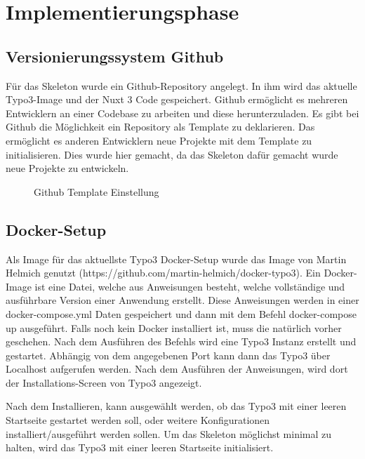 \section{Implementierungsphase} 
\label{sec:Implementierungsphase}

\subsection{Versionierungssystem Github}
\label{sec:Versionierungssystem Github}

Für das Skeleton wurde ein Github-Repository angelegt. In ihm wird das aktuelle Typo3-Image und der Nuxt 3 Code gespeichert. Github ermöglicht es mehreren Entwicklern an einer Codebase zu arbeiten und diese herunterzuladen. Es gibt bei Github die Möglichkeit ein Repository als Template zu deklarieren. Das ermöglicht es anderen Entwicklern neue Projekte mit dem Template zu initialisieren. Dies wurde hier gemacht, da das Skeleton dafür gemacht wurde neue Projekte zu entwickeln.

\begin{figure}[htb]
\centering
{}
\caption{Github Template Einstellung}
\label{fig:Github Template Einstellung}
\end{figure}

\subsection{Docker-Setup}
\label{sec:Docker-Setup}

Als Image für das aktuellste Typo3 Docker-Setup wurde das Image von Martin Helmich genutzt (https://github.com/martin-helmich/docker-typo3). Ein Docker-Image ist eine Datei, welche aus Anweisungen besteht, welche vollständige und ausführbare Version einer Anwendung erstellt. Diese Anweisungen werden in einer docker-compose.yml Daten gespeichert und dann mit dem Befehl docker-compose up ausgeführt. Falls noch kein Docker installiert ist, muss die natürlich vorher geschehen. Nach dem Ausführen des Befehls wird eine Typo3 Instanz erstellt und gestartet. Abhängig von dem angegebenen Port kann dann das Typo3 über Localhost aufgerufen werden. Nach dem Ausführen der Anweisungen, wird dort der Installations-Screen von Typo3 angezeigt. 

Nach dem Installieren, kann ausgewählt werden, ob das Typo3 mit einer leeren Startseite gestartet werden soll, oder weitere Konfigurationen installiert/ausgeführt werden sollen. Um das Skeleton möglichst minimal zu halten, wird das Typo3 mit einer leeren Startseite initialisiert.

